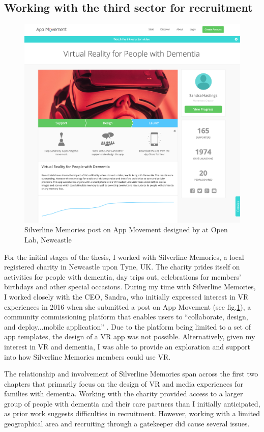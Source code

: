 \subsection{Working with the third sector for recruitment}
\label{Method:ThirdSector}
\begin{figure}[htp]
    \centering
    \includegraphics[width=0.6\linewidth]{Images/Methodology/AppMovement-SilverlineMemories.png}
    \caption{Silverline Memories post on App Movement designed by  \cite{garbett_app_2016} at Open Lab, Newcastle}
    \label{fig:AppMovement-Sandra}
\end{figure}

For the initial  stages of the thesis, I worked with Silverline Memories, a local registered charity in Newcastle upon Tyne, UK. The charity prides itself on activities for people with dementia, day trips out, celebrations for members' birthdays and other special occasions. During my time with Silverline Memories, I worked closely with the CEO, Sandra, who initially expressed interest in VR experiences in 2016 when she submitted a post on App Movement (see fig.\ref{fig:AppMovement-Sandra}), a community commissioning platform that enables users to ``collaborate, design, and deploy...mobile application'' \citep{garbett_app_2016}. Due to the platform being limited to a set of app templates, the design of a VR app was not possible. Alternatively, given my interest in VR and dementia, I was able to provide an exploration and support into how Silverline Memories members could use VR. 

The relationship and involvement of Silverline Memories span across the first two chapters that primarily focus on the design of VR and media experiences for families with dementia. Working with the charity provided access to a larger group of people with dementia and their care partners than I initially anticipated, as prior work suggests difficulties in recruitment. However, working with a limited geographical area and recruiting through a gatekeeper did cause several issues. 

